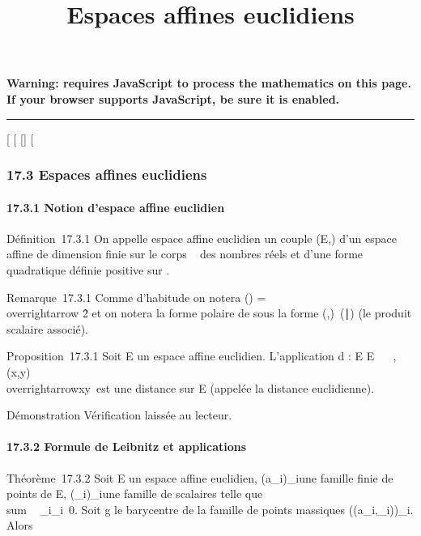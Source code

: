 \documentclass[]{article}
\title{Espaces affines euclidiens}
\author{}
\date{}
\begin{document}
\maketitle

\textbf{Warning: 
requires JavaScript to process the mathematics on this page.\\ If your
browser supports JavaScript, be sure it is enabled.}

\begin{center}\rule{3in}{0.4pt}\end{center}

[
[
[]
[

\subsubsection{17.3 Espaces affines euclidiens}

\paragraph{17.3.1 Notion d'espace affine euclidien}

Définition~17.3.1 On appelle espace affine euclidien un couple (E,\Phi)
d'un espace affine de dimension finie sur le corps ~ des nombres réels
et d'une forme quadratique définie positive \Phi sur
\overrightarrowE.

Remarque~17.3.1 Comme d'habitude on notera
\Phi(\overrightarrow\xi)
=\\overrightarrow
\xi\^2 et on notera la forme polaire
de \Phi sous la forme
(\overrightarrow\xi,\overrightarrow\eta)\mapsto~(\overrightarrow\xi\mathrel∣\overrightarrow\eta)
(le produit scalaire associé).

Proposition~17.3.1 Soit E un espace affine euclidien. L'application d :
E \times E \rightarrow~ ~,
(x,y)\mapsto~\\overrightarrowxy\
est une distance sur E (appelée la distance euclidienne).

Démonstration Vérification laissée au lecteur.

\paragraph{17.3.2 Formule de Leibnitz et applications}

Théorème~17.3.2 Soit E un espace affine euclidien,
(a_i)_i\inI une famille finie de points de E,
(\lambda_i)_i\inI une famille de scalaires telle que
\\sum ~
_i\inI\lambda_i\neq~0. Soit g le
barycentre de la famille de points massiques \left
((a_i,\lambda_i)\right )_i\inI. Alors
\end{document}
